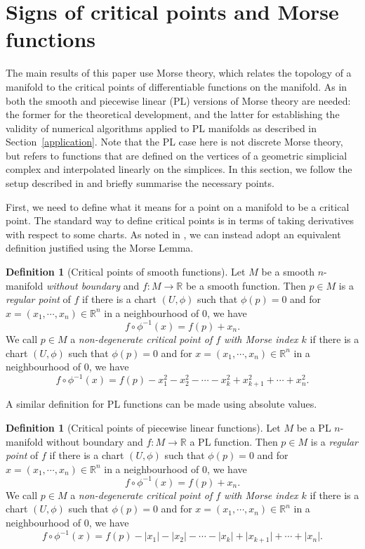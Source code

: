 \documentclass[a4paper,11pt]{article}
\theoremstyle{definition}
\newtheorem{defn}[theorem]{Definition}  \newtheorem{ex}[theorem]{Example}  \newtheorem{exs}[theorem]{Examples}  \newtheorem{question}[theorem]{Question}
\newcommand{\R}{\mathbb{R}}
\begin{document}
 

\section{Signs of critical points and Morse functions}
\label{sec:morseTheory}
 
The main results of this paper use Morse theory, which relates the topology of a manifold to the critical points of differentiable functions on the manifold. As in~\cite{KT2022} both the smooth and piecewise linear (PL) versions of Morse theory are needed: the former for the theoretical development, and the latter for establishing the validity of numerical algorithms applied to PL manifolds as described in Section~\ref{application}. 
Note that the PL case here is not discrete Morse theory, but refers to functions that are defined on the vertices of a geometric simplicial complex and interpolated linearly on the simplices. 
In this section, we follow the setup described in \cite{KT2022} and briefly summarise the necessary points.  

\medskip

First, we need to define what it means for a point on a manifold to be a critical point. The standard way to define critical points is in terms of taking derivatives with respect to some charts. As noted in \cite{KT2022}, we can instead adopt an equivalent definition justified using the Morse Lemma.
\begin{defn}[Critical points of smooth functions]
Let $M$ be a smooth $n$-manifold \emph{without boundary} and $f: M\to \R$ be a smooth function. 
Then $p\in M$ is a \emph{regular point} of $f$ if there is a chart $(U,\phi)$ such that $\phi(p)=0$ and for $x=(x_1,\cdots,x_n)\in\R^n$ in a neighbourhood of $0$, we have
$$f\circ\phi^{-1}(x) = f(p)+x_n.$$ 
We call $p\in M$ a \emph{non-degenerate critical point of $f$ with Morse index $k$} if there is a chart $(U,\phi)$ such that $\phi(p)=0$ and for $x=(x_1,\cdots,x_n)\in\R^n$ in a neighbourhood of $0$, we have
$$f\circ\phi^{-1}(x) = f(p)-x_1^2-x_2^2-\cdots -x_k^2+x_{k+1}^2+\cdots + x_n^2.$$
\end{defn}

A similar definition for PL functions can be made using absolute values.
\begin{defn}[Critical points of piecewise linear functions]
Let $M$ be a PL $n$-manifold without boundary and $f: M\to \R$ a PL function. Then $p\in M$ is a \emph{regular point} of $f$ if there is a chart $(U,\phi)$ such that $\phi(p)=0$ and for $x=(x_1,\cdots,x_n)\in\R^n$ in a neighbourhood of $0$, we have
$$f\circ\phi^{-1}(x) = f(p)+x_n.$$ 
We call $p\in M$ a \emph{non-degenerate critical point of $f$ with Morse index $k$} if there is a chart $(U,\phi)$ such that $\phi(p)=0$ and for $x=(x_1,\cdots,x_n)\in\R^n$ in a neighbourhood of $0$, we have
$$f\circ\phi^{-1}(x) = f(p)-\lvert x_1\rvert-\lvert x_2\rvert-\cdots -\lvert x_k\rvert+\lvert x_{k+1}\rvert+\cdots + \lvert x_n\rvert.$$
\end{defn}
\end{document}

